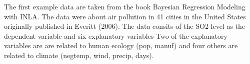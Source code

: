 \documentclass[11pt,a4paper,twoside]{book}
\begin{document}
The first example data are taken from the book Bayesian Regression Modeling with INLA. The data were about air pollution in 41 cities in the United States originally published in Everitt (2006). The data consits of the SO2 level as the dependent variable and six explanatory variables 
Two of the explanatory variables are are related to human ecology (pop, manuf) and four others are related to climate (negtemp, wind, precip, days).

 

\end{document}
